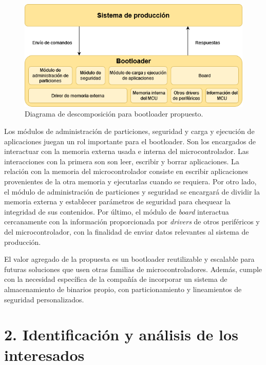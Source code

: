 \documentclass[
11pt, %
]{charter}
\begin{document}
\begin{figure}[htpb]
\centering 
\includegraphics[width=.80\textwidth]{./Figuras/GdPDiagrams-sec1_solution.png}
\caption{Diagrama de descomposición para bootloader propuesto.}
\label{fig:sec1BootloaderSolution}
\end{figure}

Los módulos de administración de particiones, seguridad y carga y ejecución de aplicaciones juegan un rol importante para el bootloader. Son los encargados de interactuar con la memoria externa usada e interna del microcontrolador. Las interacciones con la primera son son leer, escribir y borrar aplicaciones. La relación con la memoria del microcontrolador consiste en escribir aplicaciones provenientes de la otra memoria y ejecutarlas cuando se requiera. Por otro lado, el módulo de administración de particiones y seguridad se encargará de dividir la memoria externa y establecer parámetros de seguridad para chequear la integridad de sus contenidos. Por último, el módulo de \textit{board} interactua cercanamente con la información proporcionada por \textit{drivers} de otros periféricos y del microcontrolador, con la finalidad de enviar datos relevantes al sistema de producción.

El valor agregado de la propuesta es un bootloader reutilizable y escalable para futuras soluciones que usen otras familias de microcontroladores. Además, cumple con la necesidad específica de la compañía de incorporar un sistema de almacenamiento de binarios propio, con particionamiento y lineamientos de seguridad personalizados.

\newpage

\section{2. Identificación y análisis de los interesados}
\label{sec:interesados}
\end{document}
